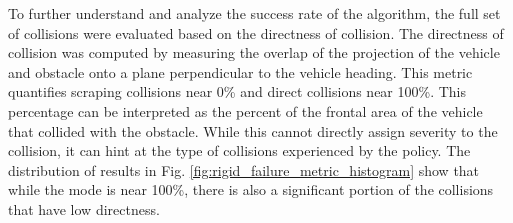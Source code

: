 To further understand and analyze the success rate of the algorithm, the full set of collisions were evaluated based on the directness of collision. The directness of collision was computed by measuring the overlap of the projection of the vehicle and obstacle onto a plane perpendicular to the vehicle heading. This metric quantifies scraping collisions near 0\% and direct collisions near 100\%. This percentage can be interpreted as the percent of the frontal area of the vehicle that collided with the obstacle. While this cannot directly assign severity to the collision, it can hint at the type of collisions experienced by the policy. The distribution of results in Fig. \ref{fig:rigid_failure_metric_histogram} show that while the mode is near 100\%, there is also a significant portion of the collisions that have low directness. %

